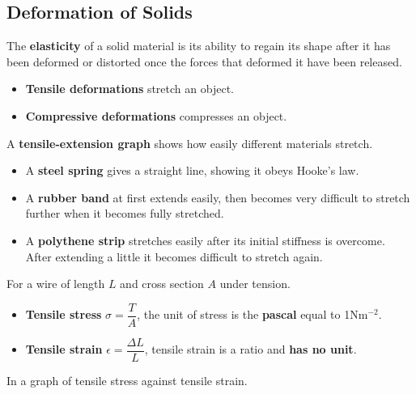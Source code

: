 \subsection{Deformation of Solids}

The \textbf{elasticity} of a solid material is its ability to regain its shape after it has been deformed or distorted once the forces that deformed it have been released.
\begin{itemize}
    \item \textbf{Tensile deformations} stretch an object.
    \item \textbf{Compressive deformations} compresses an object.
\end{itemize}

A \textbf{tensile-extension graph} shows how easily different materials stretch.
\begin{itemize}
    \item A \textbf{steel spring} gives a straight line, showing it obeys Hooke's law.
    \item A \textbf{rubber band} at first extends easily, then becomes very difficult to stretch further when it becomes fully stretched.
    \item A \textbf{polythene strip} stretches easily after its initial stiffness is overcome. After extending a little it becomes difficult to stretch again.
\end{itemize}

For a wire of length $L$ and cross section $A$ under tension.
\begin{itemize}
    \item \textbf{Tensile stress} $\sigma=\dfrac{T}{A}$, the unit of stress is the \textbf{pascal} equal to 1Nm$^{-2}$.
    \item \textbf{Tensile strain} $\epsilon=\dfrac{\Delta L}{L}$, tensile strain is a ratio and \textbf{has no unit}.
\end{itemize}

In a graph of tensile stress against tensile strain.

